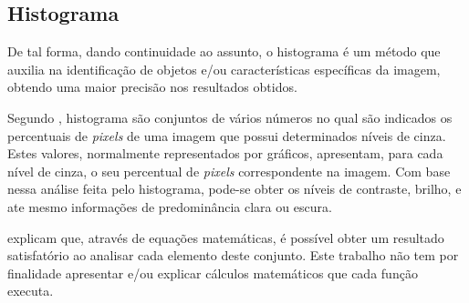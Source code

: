 \subsection{\textbf{Histograma}}

De tal forma, dando continuidade ao assunto, o histograma é um método que auxilia na identificação de objetos e/ou características específicas da imagem, obtendo uma maior precisão nos resultados obtidos.

Segundo , histograma são conjuntos de vários números no qual são indicados os percentuais de \textit{pixels} de uma imagem que possui determinados níveis de cinza. Estes valores, normalmente representados por gráficos, apresentam, para cada nível de cinza, o seu percentual de \textit{pixels} correspondente na imagem. Com base nessa análise feita pelo histograma, pode-se obter os níveis de contraste, brilho, e ate mesmo informações de predominância clara ou escura.

 explicam que, através de equações matemáticas, é possível obter um resultado satisfatório ao analisar cada elemento deste conjunto. Este trabalho não tem por finalidade apresentar e/ou explicar cálculos matemáticos que cada função executa.

%

